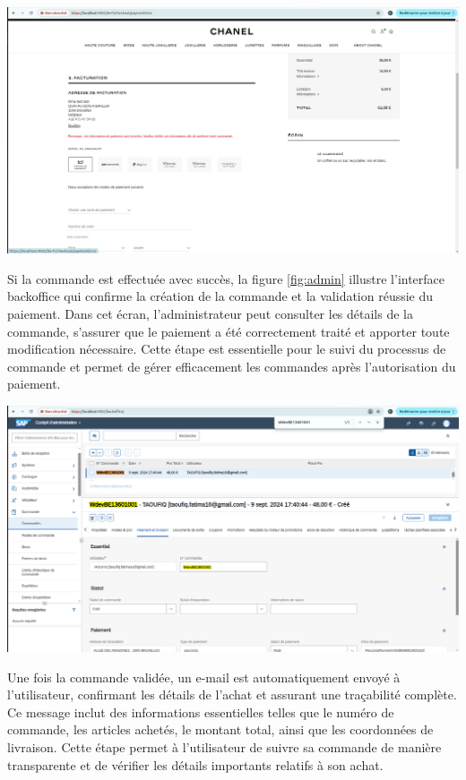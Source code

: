 \begin{center}
    \centering
    \includegraphics[width=19cm]{Figures/Screens/annulation de commande.png}
    \label{fig:erreur}
\end{center}
Si la commande est effectuée avec succès, la figure \ref{fig:admin} illustre l'interface backoffice qui confirme la création de la commande et la validation réussie du paiement. Dans cet écran, l'administrateur peut consulter les détails de la commande, s'assurer que le paiement a été correctement traité et apporter toute modification nécessaire. Cette étape est essentielle pour le suivi du processus de commande et permet de gérer efficacement les commandes après l'autorisation du paiement.
\begin{center}
    \centering
    \includegraphics[width=19cm]{Figures/Screens/Backoffice commande.png}
    \label{fig:admin}
\end{center}
Une fois la commande validée, un e-mail est automatiquement envoyé à l'utilisateur, confirmant les détails de l'achat et assurant une traçabilité complète. Ce message inclut des informations essentielles telles que le numéro de commande, les articles achetés, le montant total, ainsi que les coordonnées de livraison. Cette étape permet à l'utilisateur de suivre sa commande de manière transparente et de vérifier les détails importants relatifs à son achat.
